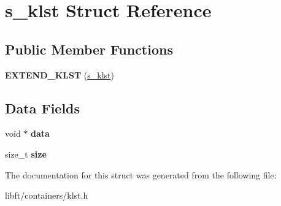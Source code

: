 \hypertarget{structs__klst}{}\section{s\+\_\+klst Struct Reference}
\label{structs__klst}
\subsection*{Public Member Functions}
\begin{DoxyCompactItemize}
\item 
\hypertarget{structs__klst_a95efc41c1293f1b6cd29de1cd4b75a82}{}{\bfseries E\+X\+T\+E\+N\+D\+\_\+\+K\+L\+S\+T} (\hyperlink{structs__klst}{s\+\_\+klst})\label{structs__klst_a95efc41c1293f1b6cd29de1cd4b75a82}

\end{DoxyCompactItemize}
\subsection*{Data Fields}
\begin{DoxyCompactItemize}
\item 
\hypertarget{structs__klst_a735984d41155bc1032e09bece8f8d66d}{}void $\ast$ {\bfseries data}\label{structs__klst_a735984d41155bc1032e09bece8f8d66d}

\item 
\hypertarget{structs__klst_a854352f53b148adc24983a58a1866d66}{}size\+\_\+t {\bfseries size}\label{structs__klst_a854352f53b148adc24983a58a1866d66}

\end{DoxyCompactItemize}


The documentation for this struct was generated from the following file\+:\begin{DoxyCompactItemize}
\item 
libft/containers/klst.\+h\end{DoxyCompactItemize}
